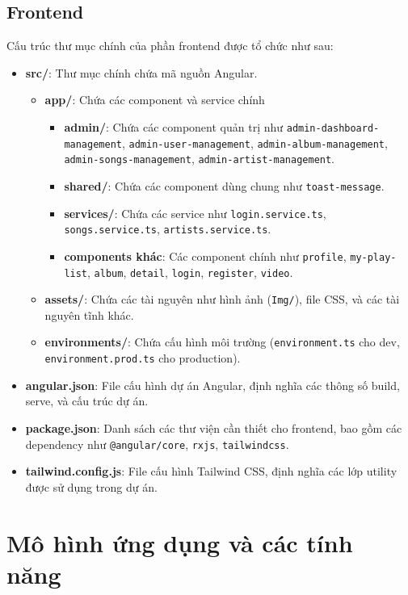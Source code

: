 \subsection{Frontend}
Cấu trúc thư mục chính của phần frontend được tổ chức như sau:
\begin{itemize}
    \item \textbf{src/}: Thư mục chính chứa mã nguồn Angular.
    \begin{itemize}
        \item \textbf{app/}: Chứa các component và service chính
        \begin{itemize}
            \item \textbf{admin/}: Chứa các component quản trị như \texttt{admin-dashboard-management}, \texttt{admin-user-management}, \texttt{admin-album-management}, \texttt{admin-songs-management}, \texttt{admin-artist-management}.
            \item \textbf{shared/}: Chứa các component dùng chung như \texttt{toast-message}.
            \item \textbf{services/}: Chứa các service như \texttt{login.service.ts}, \texttt{songs.service.ts}, \texttt{artists.service.ts}.
            \item \textbf{components khác}: Các component chính như \texttt{profile}, \texttt{my-play-list}, \texttt{album}, \texttt{detail}, \texttt{login}, \texttt{register}, \texttt{video}.
        \end{itemize}
        \item \textbf{assets/}: Chứa các tài nguyên như hình ảnh (\texttt{Img/}), file CSS, và các tài nguyên tĩnh khác.
        \item \textbf{environments/}: Chứa cấu hình môi trường (\texttt{environment.ts} cho dev, \texttt{environment.prod.ts} cho production).
    \end{itemize}
    \item \textbf{angular.json}: File cấu hình dự án Angular, định nghĩa các thông số build, serve, và cấu trúc dự án.
    \item \textbf{package.json}: Danh sách các thư viện cần thiết cho frontend, bao gồm các dependency như \texttt{@angular/core}, \texttt{rxjs}, \texttt{tailwindcss}.
    \item \textbf{tailwind.config.js}: File cấu hình Tailwind CSS, định nghĩa các lớp utility được sử dụng trong dự án.
\end{itemize}

\section{Mô hình ứng dụng và các tính năng}
